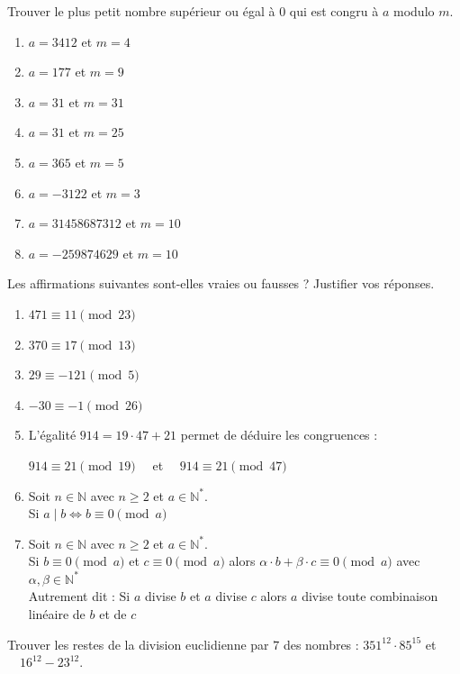 


\begin{exstheorie}
	\exo
	Trouver le plus petit nombre supérieur ou égal à 0 qui est congru à $a$ modulo $m$.
	
	
	\begin{enumerate}[label=\roman*),left=0mm]
		\item $a=3412$ et $m=4$
		\item $a=177$ et $m=9$
		\item $a=31$ et $m=31$
		\item $a=31$ et $m=25$
		\item $a=365$ et $m=5$
		\item $a=-3122$ et $m=3$
		\item $a=31458687312$ et $m=10$
		\item $a=-259874629$ et $m=10$
	\end{enumerate}
	
	
	
	\eexo
	\pagebreak[3]
	
	\exo
	\noindent Les affirmations suivantes sont-elles vraies ou fausses ? Justifier vos réponses.
	
	\begin{enumerate}
		\item[\textbf{a)}] $471 \equiv 11 \pmod {23}$
		\item[\textbf{b)}] $370 \equiv 17 \pmod {13}$
		\item[\textbf{c)}] $29 \equiv -121 \pmod 5$
		\item[\textbf{d)}] $-30 \equiv -1 \pmod {26}$
		\item[\textbf{e)}] L'égalité $914 = 19 \cdot 47 + 21$ permet de déduire les congruences :
		
		$914 \equiv 21 \pmod {19} \quad$ et $\quad 914 \equiv 21 \pmod {47}$
		
		\item[\textbf{f)}] Soit $n \in \mathbb{N}$ avec $n \ge 2$ et $a \in \mathbb{N}^*$. \\
		Si $a \mid b \iff b \equiv 0 \pmod a$
		\item[\textbf{g)}] Soit $n \in \mathbb{N}$ avec $n \ge 2$ et $a \in \mathbb{N}^*$. \\
		Si $b \equiv 0 \pmod a$ et $c \equiv 0 \pmod a$ alors $\alpha \cdot b + \beta \cdot c \equiv 0 \pmod a$ avec $\alpha, \beta \in \mathbb{N}^*$ \\
		Autrement dit : Si $a$ divise $b$ et $a$ divise $c$ alors $a$ divise toute combinaison linéaire de $b$ et de $c$
	\end{enumerate}
	\eexo
	\pagebreak[3]	
	\exo
	Trouver les restes de la division euclidienne par $7$ des nombres :
	$351^{12} \cdot 85^{15}$ et $\quad 16^{12} - 23^{12}$.
	

\end{exstheorie}
